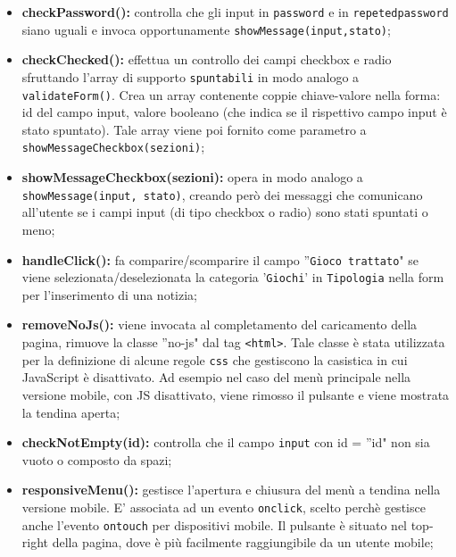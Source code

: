\begin{itemize}
	\item \textbf{checkPassword(): } controlla che gli input in \texttt{password} e in \texttt{repetedpassword} siano uguali e invoca opportunamente \texttt{showMessage(input,stato)}; \\

	\item \textbf{checkChecked(): } effettua un controllo dei campi checkbox e radio sfruttando l'array di supporto \texttt{spuntabili} in modo analogo a \texttt{validateForm()}. Crea un array contenente coppie chiave-valore nella forma: id del campo input, valore booleano (che indica se il rispettivo campo input è stato spuntato). Tale array viene poi fornito come parametro a \texttt{showMessageCheckbox(sezioni)}; \\

	\item \textbf{showMessageCheckbox(sezioni): } opera in modo analogo a \texttt{showMessage(input, stato)}, creando però dei messaggi che comunicano all'utente se i campi input (di tipo checkbox o radio) sono stati spuntati o meno; \\

	\item \textbf{handleClick(): } fa comparire/scomparire il campo ''\texttt{Gioco trattato}" se viene selezionata/deselezionata la categoria '\texttt{Giochi}' in \texttt{Tipologia} nella form per l'inserimento di una notizia; \\

	\item \textbf{removeNoJs(): }  viene invocata al completamento del caricamento della pagina, rimuove la classe ''no-js" dal tag \texttt{<html>}. Tale classe è stata utilizzata per la definizione di alcune regole \texttt{css} che gestiscono la casistica in cui JavaScript è disattivato. Ad esempio nel caso del menù principale nella versione mobile, con JS disattivato, viene rimosso il pulsante e viene mostrata la tendina aperta; \\

	\item \textbf{checkNotEmpty(id): } controlla che il campo \texttt{input} con id = ''id" non sia vuoto o composto da spazi; \\

	\item \textbf{responsiveMenu(): } gestisce l'apertura e chiusura del menù a tendina nella versione mobile.
	E' associata ad un evento \texttt{onclick}, scelto perchè gestisce anche l'evento \texttt{ontouch} per dispositivi mobile.
	Il pulsante è situato nel top-right della pagina, dove è più facilmente raggiungibile da un utente mobile; \\


\end{itemize}
